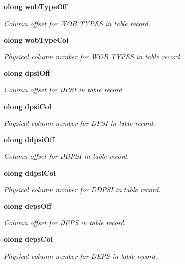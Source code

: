 \begin{CompactItemize}
{\bf olong} {\bf wob\-Type\-Off}
\begin{CompactList}\small\item\em Column offset for WOB TYPES in table record. \item\end{CompactList}\item 
{\bf olong} {\bf wob\-Type\-Col}
\begin{CompactList}\small\item\em Physical column number for WOB TYPES in table record. \item\end{CompactList}\item 
{\bf olong} {\bf dpsi\-Off}
\begin{CompactList}\small\item\em Column offset for DPSI in table record. \item\end{CompactList}\item 
{\bf olong} {\bf dpsi\-Col}
\begin{CompactList}\small\item\em Physical column number for DPSI in table record. \item\end{CompactList}\item 
{\bf olong} {\bf ddpsi\-Off}
\begin{CompactList}\small\item\em Column offset for DDPSI in table record. \item\end{CompactList}\item 
{\bf olong} {\bf ddpsi\-Col}
\begin{CompactList}\small\item\em Physical column number for DDPSI in table record. \item\end{CompactList}\item 
{\bf olong} {\bf deps\-Off}
\begin{CompactList}\small\item\em Column offset for DEPS in table record. \item\end{CompactList}\item 
{\bf olong} {\bf deps\-Col}
\begin{CompactList}\small\item\em Physical column number for DEPS in table record. \item\end{CompactList}\item 

\end{CompactItemize}
